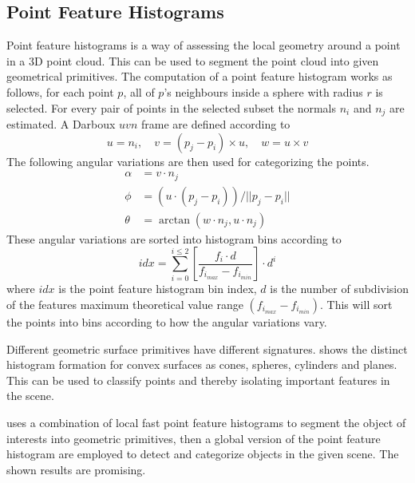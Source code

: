 \subsection{Point Feature Histograms}
Point feature histograms is a way of assessing the local geometry around a point in a
3D point cloud. This can be used to segment the point cloud into given geometrical
primitives. The computation of a point feature histogram works as follows, for each point
$p$, all of $p$'s neighbours inside a sphere with radius $r$ is selected. For every pair
of points in the selected subset the normals $n_i$ and $n_j$ are estimated. A Darboux
$uvn$ frame are defined according to 
\begin{equation}
    u = n_i, \quad v = (p_j - p_i)\times u, \quad w = u \times v
\end{equation}
The following angular variations are then used for categorizing the points. \cite{pfh}
\begin{equation}
    \begin{aligned}
        \alpha &= v \cdot n_j \\
        \phi &= (u \cdot (p_j - p_i)) / || p_j - p_i|| \\
        \theta &= \arctan (w \cdot n_j, u \cdot n_j)
    \end{aligned}
\end{equation}
These angular variations are sorted into histogram bins according to 
\begin{equation}
    idx = \sum_{i=0}^{i \leq 2} \left [ \frac{f_i \cdot d}{f_{i_{max}} - f_{i_{min}}}
    \right] \cdot d^i
\end{equation}
where $idx$ is the point feature histogram bin index, $d$ is the number of subdivision of
the features maximum theoretical value range $(f_{i_{max}} - f_{i_{min}})$. This will sort
the points into bins according to how the angular variations vary. 

Different geometric surface primitives have different signatures. \cite{pfh-geometric}
shows the distinct histogram formation for convex surfaces as cones, spheres, cylinders
and planes. This can be used to classify points and thereby isolating important features
in the scene. 

\cite{pfh-segmenting} uses a combination of local fast point feature histograms to segment
the object of interests into geometric primitives, then a global version of the point
feature histogram are employed to detect and categorize objects in the given scene. The
shown results are promising. 

